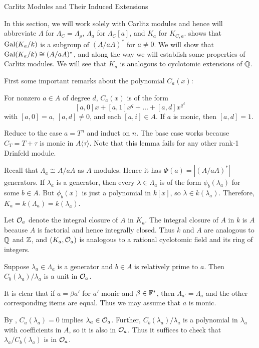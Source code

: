 \documentclass[12pt]{article}
\begin{document}
\begin{section}{Carlitz Modules and Their Induced Extensions}

In this section, we will work solely with Carlitz modules and hence will
abbreviate $\Lambda$ for $\Lambda_C = \Lambda_\rho$, $\Lambda_a$ for
$\Lambda_C[a]$, and $K_a$ for $K_{C,a}$.   shows that
$\operatorname{Gal}(K_a/k)$ is a subgroup of $(A/aA)^*$ for $a \neq 0$.  We will show
that $\operatorname{Gal}(K_a/k) \cong (A/aA)^*$, and along the way we will establish
some properties of Carlitz modules.  We will see that $K_a$ is analogous
to cyclotomic extensions of ${\mathbb Q}$.

First some important remarks about the polynomial $C_a(x)$:
\begin{lemma}
For nonzero $a \in A$ of degree $d$, $C_a(x)$ is of the form
$$[a,0]x + [a,1]x^q + \ldots + [a,d]x^{q^d}$$
with $[a,0] = a$, $[a,d] \neq 0$, and each $[a,i] \in A$.  If $a$ is
monic, then $[a,d] = 1$.
\end{lemma}

\pf
Reduce to the case $a = T^n$ and induct on $n$.  The base case works
because $C_T = T + \tau$ is monic in $A\langle\tau\rangle$.  Note that
this lemma fails for any other rank-1 Drinfeld module.
\hamlos

Recall that $\Lambda_a \cong A/aA$ as $A$-modules.  Hence it has
$\Phi(a) = |(A/aA)^*|$ generators.  If $\lambda_a$ is a generator, then
every $\lambda \in \Lambda_a$ is of the form $\phi_b(\lambda_a)$ for some
$b \in A$.  But $\phi_b(x)$ is just a polynomial in $k[x]$, so
$\lambda \in k(\lambda_a)$.  Therefore, $K_a = k(\Lambda_a) =
k(\lambda_a)$.

Let ${\mathcal O}_a$ denote the integral closure of $A$ in $K_a$.
The integral closure of $A$ in $k$ is $A$ because $A$ is factorial and
hence integrally closed.  Thus $k$ and $A$ are analogous to ${\mathbb Q}$ and
${\mathbb Z}$, and $(K_a, {\mathcal O}_a)$ is analogous to a rational cyclotomic field and
its ring of integers.

\begin{lemma}
Suppose $\lambda_a \in \Lambda_a$ is a generator and $b \in A$ is
relatively prime to $a$.  Then $C_b(\lambda_a)/\lambda_a$ is a unit in
${\mathcal O}_a$.
\end{lemma}

\pf
It is clear that if $a = \beta a'$ for $a'$ monic and $\beta \in {\mathbb F}^*$,
then $\Lambda_{a'} = \Lambda_a$ and the other corresponding items are
equal.  Thus we may assume that $a$ is monic.

By , $C_a(\lambda_a) = 0$ implies $\lambda_a \in {\mathcal O}_a$.
Further, $C_b(\lambda_a)/\lambda_a$ is a polynomial in $\lambda_a$ with
coefficients in $A$, so it is also in ${\mathcal O}_a$.  Thus it suffices to check
that $\lambda_a/C_b(\lambda_a)$ is in ${\mathcal O}_a$.


\end{section}
\end{document}
